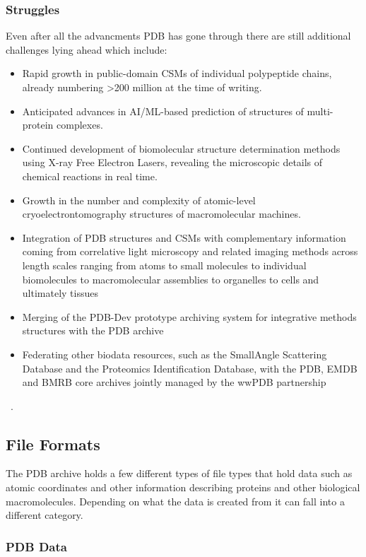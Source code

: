 \documentclass{report}
\begin{document}
\subsubsection{Struggles}
Even after all the advancments PDB has gone through there are still additional challenges lying ahead which include:

\begin{itemize}
    \item Rapid growth in public-domain CSMs of individual polypeptide chains, already numbering >200 million at the time of writing.
    \item Anticipated advances in AI/ML-based prediction of structures of multi-protein complexes.
    \item Continued development of biomolecular structure determination methods using X-ray Free Electron Lasers, revealing the microscopic details of chemical reactions in real time.
    \item Growth in the number and complexity of atomic-level cryoelectrontomography structures of macromolecular machines.
    \item Integration of PDB structures and CSMs with complementary information coming from correlative light microscopy and related imaging methods across length scales ranging from atoms to small molecules to individual biomolecules to macromolecular assemblies to organelles to cells and ultimately tissues
    \item Merging of the PDB-Dev prototype archiving system for integrative methods structures with the PDB archive
    \item Federating other biodata resources, such as the SmallAngle Scattering Database and the Proteomics Identification Database, with the PDB, EMDB and BMRB core archives jointly managed by the wwPDB partnership
\end{itemize}
~\cite{burley1_rcsb_2022}.

\subsection{File Formats}

The PDB archive holds a few different types of file types that hold data such as atomic coordinates and other information describing proteins and other biological macromolecules. Depending on what the data is created from it can fall into a different category.

\subsubsection{PDB Data}
\end{document}
